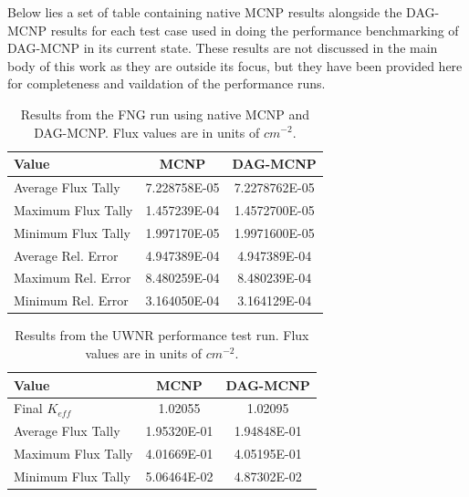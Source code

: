 \documentclass[10pt, a4paper]{article}
\begin{document}
Below lies a set of table containing native MCNP results alongside the DAG-MCNP results for each test case used in doing the performance benchmarking of DAG-MCNP in its current state. These results are not discussed in the main body of this work as they are outside its focus, but they have been provided here for completeness and vaildation of the performance runs.

\begin{table}[H]
  \caption{Results from the FNG run using native MCNP and DAG-MCNP. Flux values are in units of  $cm^{-2}$.}
  \label{fng_perf_results}
  \centering
  \begin{tabular}{l c c}
    \toprule
    Value & MCNP & DAG-MCNP \\
    \hline
    Average Flux Tally & 7.228758E-05 & 7.2278762E-05 \\
    \hline
    Maximum Flux Tally & 1.457239E-04 & 1.4572700E-05 \\
    \hline
    Minimum Flux Tally & 1.997170E-05 & 1.9971600E-05 \\
    \hline
    Average Rel. Error & 4.947389E-04 & 4.947389E-04 \\
    \hline
    Maximum Rel. Error & 8.480259E-04 & 8.480239E-04 \\
    \hline
    Minimum Rel. Error & 3.164050E-04 & 3.164129E-04 \\
    \bottomrule
  \end{tabular}  
\end{table}

\begin{table}[H]
  \centering
  \caption{Results from the UWNR performance test run. Flux values are in units of $cm^{-2}$.}
  \label{uwnr_perf_results}
  \begin{tabular}{l c c}
    \toprule
    Value & MCNP & DAG-MCNP \\
    \hline
    Final $K_{eff}$ & 1.02055 & 1.02095 \\
    \hline
    Average Flux Tally & 1.95320E-01 & 1.94848E-01 \\
    \hline
    Maximum Flux Tally & 4.01669E-01 & 4.05195E-01 \\
    \hline
    Minimum Flux Tally & 5.06464E-02 & 4.87302E-02 \\
    \bottomrule
  \end{tabular}
\end{table}
\end{document}
